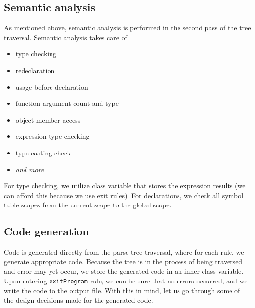 \documentclass[a4paper,11pt]{article}
\begin{document}
       \subsection{Semantic analysis}
            As mentioned above, semantic analysis is performed in the second pass of the tree traversal.
            Semantic analysis takes care of:
            \begin{itemize}
                \item type checking
                \item redeclaration
                \item usage before declaration
                \item function argument count and type
                \item object member access
                \item expression type checking
                \item type casting check
                \item \textit{and more}
            \end{itemize}

            For type checking, we utilize class variable that stores the expression results (we can afford this because we use exit rules).
            For declarations, we check all symbol table scopes from the current scope to the global scope.

		\subsection {Code generation}
	            Code is generated directly from the parse tree traversal, where for each rule, we generate appropriate code.
                Because the tree is in the process of being traversed and error may yet occur, we store the generated code in an inner class variable.
                Upon entering \texttt{exitProgram} rule, we can be sure that no errors occurred, and we write the code to the output file.
                With this in mind, let us go through some of the design decisions made for the generated code.
\end{document}

